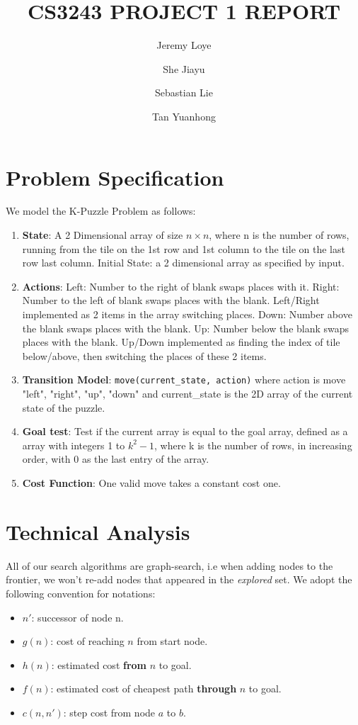\documentclass{llncs}
\begin{document}
\title{CS3243 PROJECT 1 REPORT}
\author{Jeremy Loye \and She Jiayu \and Sebastian Lie \and Tan Yuanhong}
\maketitle
\section{Problem Specification}
We model the K-Puzzle Problem as follows:
\begin{enumerate}
	\item \textbf{State}: A 2 Dimensional array of size $n \times n$, where n is the number of rows, running from the tile on the 1st row and 1st column to the tile on the last row last column. Initial State: a 2 dimensional array as specified by input.
	\item \textbf{Actions}: Left: Number to the right of blank swaps places with it.  Right: Number to the left of blank swaps places with the blank. Left/Right implemented as 2 items in the array switching places. Down: Number above the blank swaps places with the blank. Up: Number below the blank swaps places with the blank. Up/Down implemented as finding the index of tile below/above, then switching the places of these 2 items.
	\item \textbf{Transition Model}: \texttt{move(current\_state, action)} where action is move "left", "right", "up", "down" and current\_state is the 2D array of the current state of the puzzle.
	\item \textbf{Goal test}: Test if the current array is equal to the goal array, defined as a array with integers 1 to $k^2 - 1$, where k is the number of rows, in increasing order, with 0 as the last entry of the array.
	\item \textbf{Cost Function}: One valid move takes a constant cost one.
\end{enumerate}

\section{Technical Analysis}
All of our search algorithms are graph-search, i.e when adding nodes to the frontier, we won’t re-add nodes that appeared in the \emph{explored} set. We adopt the following convention for notations:
\begin{itemize}
    \item $n'$: successor of node n. 
	\item $g(n)$: cost of reaching $n$ from start node.
	\item $h(n)$: estimated cost \textbf{from} $n$ to goal.
	\item $f(n)$: estimated cost of cheapest path \textbf{through} $n$ to goal.
	\item $c(n,n')$: step cost from node $a$ to $b$.
\end{itemize}
\end{document}

